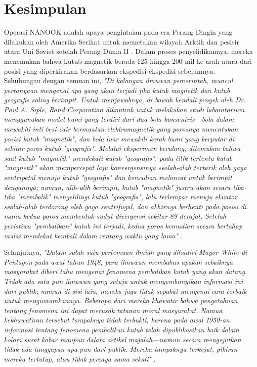 \documentclass[10pt,twocolumn,letterpaper]{article}
\begin{document}
\section{Kesimpulan}

Operasi NANOOK adalah upaya pengintaian pada era Perang Dingin yang dilakukan oleh Amerika Serikat untuk memetakan wilayah Arktik dan pesisir utara Uni Soviet setelah Perang Dunia II \cite{137}. Dalam proses penyelidikannya, mereka menemukan bahwa kutub magnetik berada 125 hingga 200 mil ke arah utara dari posisi yang diperkirakan berdasarkan ekspedisi-ekspedisi sebelumnya. Sehubungan dengan temuan ini, \textit{"Di kalangan ilmuwan pemerintah, muncul pertanyaan mengenai apa yang akan terjadi jika kutub magnetik dan kutub geografis saling berimpit. Untuk menjawabnya, di bawah kendali proyek oleh Dr. Paul A. Siple, Rand Corporation dikontrak untuk melakukan studi laboratorium menggunakan model bumi yang terdiri dari dua bola konsentris—bola dalam mewakili inti besi cair bermuatan elektromagnetik yang porosnya menentukan posisi kutub "magnetik", dan bola luar mewakili kerak bumi yang berputar di sekitar poros kutub "geografis". Melalui eksperimen berulang, ditemukan bahwa saat kutub "magnetik" mendekati kutub "geografis", pada titik tertentu kutub "magnetik" akan mempercepat laju konvergensinya seolah-olah tertarik oleh gaya sentripetal menuju kutub "geografis" dan kemudian meloncat untuk berimpit dengannya; namun, alih-alih berimpit, kutub "magnetik" justru akan secara tiba-tiba "membalik" mengelilingi kutub "geografis", lalu terlempar menuju ekuator seolah-olah terdorong oleh gaya sentrifugal, dan akhirnya berhenti pada posisi di mana kedua poros membentuk sudut divergensi sekitar 89 derajat. Setelah peristiwa "pembalikan" kutub ini terjadi, kedua poros kemudian secara bertahap mulai mendekat kembali dalam rentang waktu yang lama"} \cite{138,139}.

Selanjutnya, \textit{"Dalam salah satu pertemuan ilmiah yang dihadiri Mayor White di Pentagon pada awal tahun 1948, para ilmuwan membahas apakah sebaiknya masyarakat diberi tahu mengenai fenomena pembalikan kutub yang akan datang. Tidak ada satu pun ilmuwan yang setuju untuk menyembunyikan informasi ini dari publik; namun di sisi lain, mereka juga tidak sepakat mengenai cara terbaik untuk mengumumkannya. Beberapa dari mereka khawatir bahwa pengetahuan tentang fenomena ini dapat merusak tatanan moral masyarakat. Namun kekhawatiran tersebut tampaknya tidak terbukti, karena pada awal 1950-an informasi tentang fenomena pembalikan kutub telah dipublikasikan baik dalam kolom surat kabar maupun dalam artikel majalah—namun secara mengejutkan tidak ada tanggapan apa pun dari publik. Mereka tampaknya terkejut, pikiran mereka tertutup, atau tidak percaya sama sekali"} \cite{138,139}.
\end{document}
